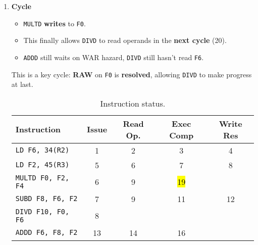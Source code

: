 \begin{enumerate}
    \newpage


    \item \textbf{Cycle \theenumi}
    \begin{itemize}
        \item[\textcolor{Green3}{\faIcon{check}}] \texttt{MULTD} \textbf{writes} to \texttt{F0}.
        \item[\textcolor{Green3}{\faIcon{check}}] This finally allows \texttt{DIVD} to read operands in the \textbf{next cycle} (20).
        \item[\textcolor{Red2}{\faIcon{exclamation-triangle}}] \texttt{ADDD} still waits on WAR hazard, \texttt{DIVD} still hasn't read \texttt{F6}.
    \end{itemize}
    This is a key cycle: \textbf{RAW} on \texttt{F0} is \textbf{resolved}, allowing \texttt{DIVD} to make progress at last.

    \begin{table}[!htp]
        \centering
        \begin{tabular}{@{} l | c c c c @{}}
            \toprule
            Instruction                 & Issue     & Read Op.  & Exec Comp & Write Res \\
            \midrule
            \texttt{LD    F6, 34(R2)}   & 1         & 2         & 3         & 4         \\ [.3em]
            \texttt{LD    F2, 45(R3)}   & 5         & 6         & 7         & 8         \\ [.3em]
            \texttt{MULTD F0, F2, F4}   & 6         & 9         & \hl{19}   &           \\ [.3em]
            \texttt{SUBD  F8, F6, F2}   & 7         & 9         & 11        & 12        \\ [.3em]
            \texttt{DIVD  F10, F0, F6}  & 8         &           &           &           \\ [.3em]
            \texttt{ADDD  F6, F8, F2}   & 13        & 14        & 16        &           \\
            \bottomrule
        \end{tabular}
        \caption*{Instruction status.}
    \end{table}


\end{enumerate}
